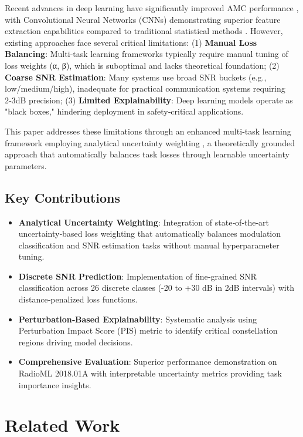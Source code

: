 \documentclass{ELSP}
\begin{document}
Recent advances in deep learning have significantly improved AMC performance \cite{peng2021survey}, with Convolutional Neural Networks (CNNs) demonstrating superior feature extraction capabilities compared to traditional statistical methods \cite{azzouz1995algorithms}. However, existing approaches face several critical limitations: (1) \textbf{Manual Loss Balancing}: Multi‑task learning frameworks typically require manual tuning of loss weights (α, β), which is suboptimal and lacks theoretical foundation; (2) \textbf{Coarse SNR Estimation}: Many systems use broad SNR buckets (e.g., low/medium/high), inadequate for practical communication systems requiring 2‑3dB precision; (3) \textbf{Limited Explainability}: Deep learning models operate as "black boxes," hindering deployment in safety‑critical applications.

This paper addresses these limitations through an enhanced multi‑task learning framework employing analytical uncertainty weighting \cite{liu2024analytical}, a theoretically grounded approach that automatically balances task losses through learnable uncertainty parameters.

\subsection*{Key Contributions}
\begin{itemize}
\item \textbf{Analytical Uncertainty Weighting}: Integration of state‑of‑the‑art uncertainty‑based loss weighting that automatically balances modulation classification and SNR estimation tasks without manual hyperparameter tuning.
\item \textbf{Discrete SNR Prediction}: Implementation of fine‑grained SNR classification across 26 discrete classes (-20 to +30 dB in 2dB intervals) with distance‑penalized loss functions.
\item \textbf{Perturbation‑Based Explainability}: Systematic analysis using Perturbation Impact Score (PIS) metric to identify critical constellation regions driving model decisions.
\item \textbf{Comprehensive Evaluation}: Superior performance demonstration on RadioML 2018.01A with interpretable uncertainty metrics providing task importance insights.
\end{itemize}

\section{Related Work}
\end{document}
